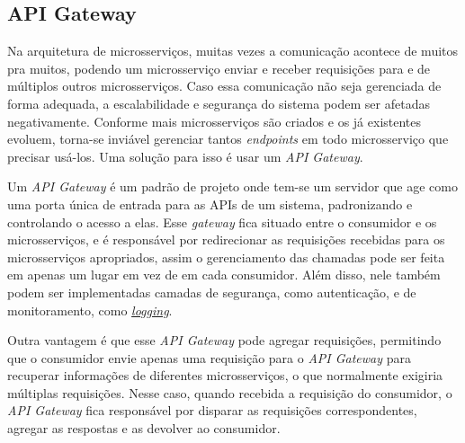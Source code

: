 
\subsection{API Gateway}\label{boas-praticas-api-gateway}
Na arquitetura de microsserviços, muitas vezes a comunicação acontece de muitos pra muitos, podendo um microsserviço enviar e receber requisições para e de múltiplos outros microsserviços. Caso essa comunicação não seja gerenciada de forma adequada, a escalabilidade e segurança do sistema podem ser afetadas negativamente. Conforme mais microsserviços são criados e os já existentes evoluem, torna-se inviável gerenciar tantos \emph{endpoints} em todo microsserviço que precisar usá-los. Uma solução para isso é usar um \emph{API Gateway}. \cite{livro-building-microservices}

Um \emph{API Gateway} é um padrão de projeto onde tem-se um servidor que age como uma porta única de entrada para as APIs de um sistema, padronizando e controlando o acesso a elas. Esse \emph{gateway} fica situado entre o consumidor e os microsserviços, e é responsável por redirecionar as requisições recebidas para os microsserviços apropriados, assim o gerenciamento das chamadas pode ser feita em apenas um lugar em vez de em cada consumidor. Além disso, nele também podem ser implementadas camadas de segurança, como autenticação, e de monitoramento, como \hyperref[subsecao-registros]{\emph{logging}}.

Outra vantagem é que esse \emph{API Gateway} pode agregar requisições, permitindo que o consumidor envie apenas uma requisição para o \emph{API Gateway} para recuperar informações de diferentes microsserviços, o que normalmente exigiria múltiplas requisições. Nesse caso, quando recebida a requisição do consumidor, o \emph{API Gateway} fica responsável por disparar as requisições correspondentes, agregar as respostas e as devolver ao consumidor.

